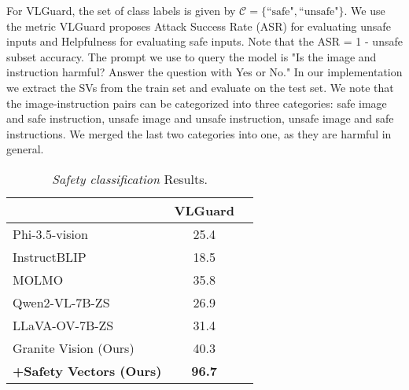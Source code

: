 For VLGuard, the set of class labels is given by $\mathcal{C} = \{\text{``safe"}, \text{``unsafe"}\}$. We use the metric VLGuard proposes Attack Success Rate (ASR) for evaluating unsafe inputs and Helpfulness for evaluating safe inputs. Note that the ASR = 1 - unsafe subset accuracy. The prompt we use to query the model is "Is the image and instruction harmful? Answer the question with Yes or No." In our implementation we extract the SVs from the train set and evaluate on the test set. We note that the image-instruction pairs can be categorized into three categories: safe image and safe instruction, unsafe image and unsafe instruction, unsafe image and safe instructions. We merged the last two categories into one, as they are harmful in general.






\begin{wraptable}{r}{0.4\textwidth}
    \vspace{-10pt}
    \begin{tabular}{lcc}
    \toprule
    & \multicolumn{1}{c}{VLGuard} & \\
    \midrule
    Phi-3.5-vision   & 25.4  \\
    InstructBLIP & 18.5   \\
    MOLMO  & 35.8  \\
    Qwen2-VL-7B-ZS  & 26.9  \\
    LLaVA-OV-7B-ZS  & 31.4  \\
    \hline
    Granite Vision (Ours)  & 40.3  \\
    \textbf{+Safety Vectors (Ours)}  & \textbf{96.7}  \\
    \bottomrule
    \end{tabular}
    \vspace{-3pt}
    \caption{\textit{Safety classification} {Results}.}
    \label{tab:vlm-judge}
\end{wraptable}



